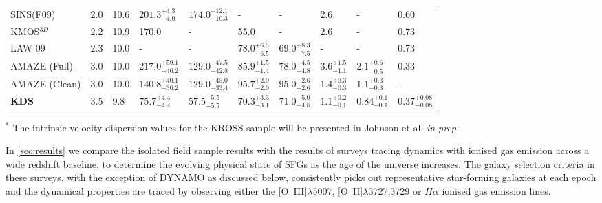 \documentclass[fleqn,usenatbib]{mnras}
\newcommand{\cmark}{\ding{51}}%
\newcommand{\xmark}{\ding{55}}%
\begin{document}
\begin{table*}
\begin{threeparttable}
\begin{tabular}{llllllllll}
 SINS(F09) & 2.0 & 10.6 &       $201.3^{+4.3}_{-4.0}$  \cmark & $174.0^{+12.1}_{-10.3}$ &  -                    \xmark & -                    & 2.6                  \xmark &           -                   &               0.60                    \xmark   \\[1ex]
 KMOS$^{3D}$ & 2.2 & 10.9 &     170.0                  \xmark & -                       &  55.0                 \xmark & -                    & 2.6                  \xmark &           -                   &               0.73                    \xmark   \\[1ex]
 LAW 09 & 2.3 & 10.0 &          -                      \xmark & -                       &  $78.0^{+6.5}_{-6.5}$ \xmark & $69.0^{+8.3}_{-7.5}$ & -                    \xmark &           -                   &               0.73                    \xmark   \\[1ex]
 AMAZE (Full) & 3.0 & 10.0 &    $217.0^{+59.1}_{-40.2}$\xmark & $129.0^{+47.5}_{-42.8}$ &  $85.9^{+1.5}_{-1.4}$ \xmark & $78.0^{+4.5}_{-4.8}$ & $3.6^{+1.5}_{-1.1}$  \xmark &           $2.1^{+0.6}_{-0.5}$ &               0.33                    \xmark   \\[1ex]
 AMAZE (Clean) & 3.0 & 10.0 &   $140.8^{+40.1}_{-30.2}$\cmark & $129.0^{+45.0}_{-33.4}$ &  $95.7^{+2.0}_{-2.0}$ \cmark & $95.0^{+2.6}_{-2.6}$ & $1.4^{+0.3}_{-0.3}$  \cmark &           $1.1^{+0.3}_{-0.3}$ &               -                       \xmark   \\[1ex]
 \textbf{KDS} & 3.5 & 9.8 &     $75.7^{+4.4}_{-4.4}$   \cmark & $57.5^{+5.5}_{-5.5}$    &  $70.3^{+3.3}_{-3.1}$ \cmark & $71.0^{+5.0}_{-4.8}$ & $1.1^{+0.2}_{-0.1}$  \cmark &            $0.84^{+0.1}_{-0.1}$&               $0.37^{+0.08}_{-0.08}$ \cmark    \\[1ex]
 \hline
\end{tabular}
\begin{tablenotes}
      \small
      \item $^{*}$ The intrinsic velocity dispersion values for the KROSS sample will be presented in Johnson et al. {\it in prep.} 
    \end{tablenotes}
  \end{threeparttable}
  \end{table*}

In \cref{sec:results} we compare the isolated field sample results with the results of surveys tracing dynamics with ionised gas emission across a wide redshift baseline, to determine the evolving physical state of SFGs as the age of the universe increases.
The galaxy selection criteria in these surveys, with the exception of DYNAMO \citep{Green2014} as discussed below, consistently picks out representative star-forming galaxies at each epoch and the dynamical properties are traced by observing either the [O~{\sc III}]$\lambda$5007, [O~{\sc II}]$\lambda$3727,3729 or $H\alpha$ ionised gas emission lines.
\end{document}
